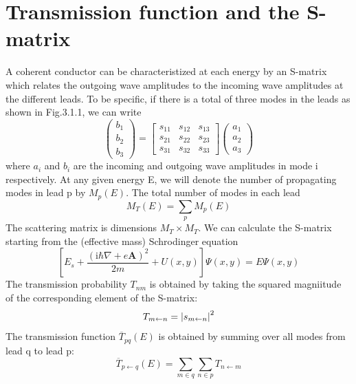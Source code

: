 \documentclass[11pt,a4paper]{book}
\theoremstyle{plain}
\theoremstyle{definition}
\theoremstyle{remark}
\newcommand{\ii}{\mathrm{i}}                      %
\renewcommand{\vec}[1]{\boldsymbol{#1}}
\begin{document}
\section{Transmission function and the S-matrix}
A coherent conductor can be characteristized at each energy by an S-matrix which relates the outgoing wave amplitudes to the incoming wave amplitudes at the different leads. To be specific, if there is a total of three modes in the leads as shown in Fig.3.1.1, we can write
\begin{equation}
    \begin{pmatrix}
        b_1 \\
        b_2 \\
        b_3
    \end{pmatrix}
    =
    \begin{bmatrix}
        s_{11} & s_{12} & s_{13} \\
        s_{21} & s_{22} & s_{23} \\
        s_{31} & s_{32} & s_{33}
    \end{bmatrix}
    \begin{pmatrix}
        a_1 \\
        a_2 \\
        a_3
    \end{pmatrix}
\end{equation}
where $a_i$ and $b_i$ are the incoming and outgoing wave amplitudes in mode i respectively. At any given energy E, we will denote the number of propagating modes in lead p by $M_p(E)$. The total number of modes in each lead
\begin{equation}
    M_T(E) = \sum_p M_p(E)
\end{equation}
The scattering matrix is dimensions $M_T \times M_T$. We can calculate the S-matrix starting from the (effective mass) Schrodinger equation
\begin{equation}
    \left[E_s + \frac{(\ii \hbar \nabla + e\vec{A})^2}{2 m} + U(x,y) \right] \Psi(x,y) = E \Psi(x,y)
\end{equation}
The transmission probability $T_{nm}$ is obtained by taking the squared magniitude of the corresponding element of the S-matrix:
\begin{equation}
    T_{m\leftarrow n} = \abs{s_{m\leftarrow n}}^2
\end{equation}
The transmission function $\overline{T}_{pq}(E)$ is obtained by summing over all modes from lead q to lead p:
\begin{equation}
    \overline{T}_{p\leftarrow q}(E) = \sum_{m \in q} \sum_{n \in p} T_{n \leftarrow m}
\end{equation}
\end{document}
